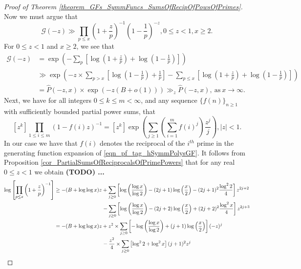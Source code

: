 \documentclass[11pt,reqno,a4letter]{article}
\numberwithin{figure}{section}
\numberwithin{table}{section}
\theoremstyle{plain}
\numberwithin{theorem}{section}
\theoremstyle{definition}
\begin{document}
\begin{proof}[Proof of Theorem \ref{theorem_GFs_SymmFuncs_SumsOfRecipOfPowsOfPrimes}]
Now we must argue that 
\[
\mathcal{G}(-z) \gg \prod_{p \leq x} \left(1 + \frac{z}{p}\right)^{-1} 
     \left(1 - \frac{1}{p}\right)^{-z}, 0 \leq z < 1, x \geq 2. 
\]
For $0 \leq z < 1$ and $x \geq 2$, we see that 
\begin{align*} 
\mathcal{G}(-z) & = \exp\left(-\sum_p \left[\log\left(1 + \frac{z}{p}\right) + 
     \log\left(1 - \frac{1}{p}\right)\right]\right) \\ 
     & \gg 
     \exp\left(-z \times \sum_{p > x} \left[
     \log\left(1 - \frac{1}{p}\right) + \frac{1}{p}\right] - 
     \sum_{p \leq x} \left[\log\left(1 + \frac{z}{p}\right) + 
     \log\left(1 - \frac{1}{p}\right)\right]\right) \\ 
     & = \widehat{P}(-z, x) \times \exp\left(-z(B+o(1))\right) 
     \gg_z \widehat{P}(-z, x), \mathrm{\ as\ } x \rightarrow \infty. 
\end{align*} 
Next, we have for all integers $0 \leq k \leq m < \infty$, and any sequence 
$\{f(n)\}_{n \geq 1}$ with sufficiently bounded partial power sums, that 
\cite[\S 2]{MACDONALD-SYMFUNCS} 
\begin{equation} 
\label{eqn_pf_tag_hSymmPolysGF} 
[z^k] \prod_{1 \leq i \leq m} (1-f(i) z)^{-1} = [z^k] \exp\left(\sum_{j \geq 1} 
     \left(\sum_{i=1}^m f(i)^j\right) \frac{z^j}{j}\right), |z| < 1. 
\end{equation} 
In our case we have that $f(i)$ denotes the reciprocal of the 
$i^{th}$ prime in the generating function expansion of 
\eqref{eqn_pf_tag_hSymmPolysGF}. 
It follows from Proposition \ref{cor_PartialSumsOfReciprocalsOfPrimePowers} that 
for any real $0 \leq z < 1$ we obtain 
\textbf{(TODO) ... } 
\begin{align} 
\notag 
\log\left[\prod_{p \leq x} \left(1+\frac{z}{p}\right)^{-1}\right] & \geq -(B + \log\log x) z + 
     \sum_{j \geq 0} \left[\log\left(\frac{\log x}{\log 2}\right) - 
     (2j+1) \log\left(\frac{x}{2}\right) - (2j+1)^2 \frac{\log^2 2}{4}\right] z^{2j+2} \\ 
\notag 
     & \phantom{\geq -(B + \log\log x) z\ } - 
     \sum_{j \geq 0} \left[\log\left(\frac{\log x}{\log 2}\right) - 
     (2j+2) \log\left(\frac{x}{2}\right) + (2j+2)^2 \frac{\log^2 x}{4}\right] z^{2j+3} \\ 
\notag 
     & = -(B + \log\log x) z + z^2 \times \sum_{j \geq 0} \left[ 
     -\log\left(\frac{\log x}{\log 2}\right) + 
     (j+1) \log\left(\frac{x}{2}\right)\right] (-z)^j \\ 
\notag 
     & \phantom{= -(B + \log\log x) z\ } - 
     \frac{z^2}{4} \times \sum_{j \geq 0} \left[\log^2 2 + \log^2 x\right] (j+1)^2 z^j \\ 

\end{align}
\end{proof}
\end{document}
